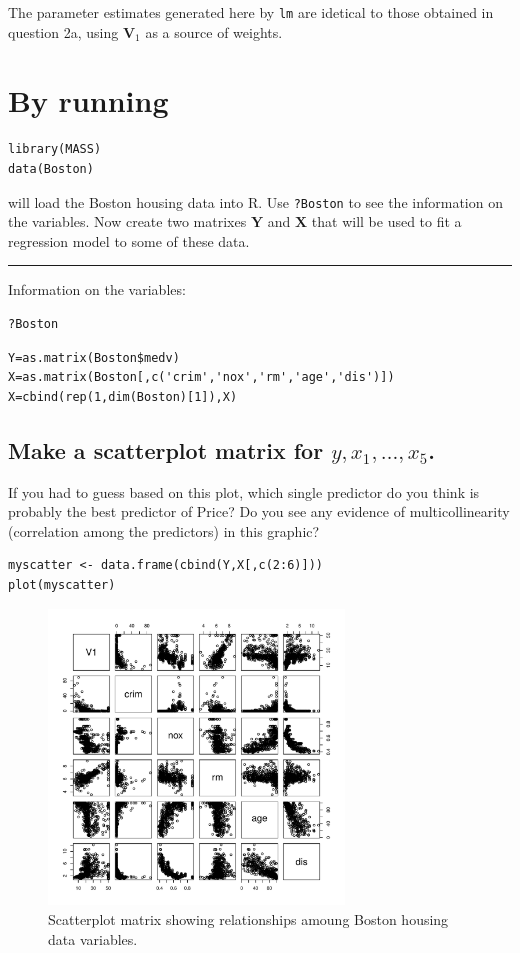 \documentclass[11pt]{article}
\begin{document}
The parameter estimates generated here by \verb~lm~ are idetical to those obtained in
question 2a, using \textbf{V$_1$} as a source of weights.
\section{By running}
\label{sec-4}



\begin{verbatim}
library(MASS)
data(Boston)
\end{verbatim}

will load the Boston housing data into R. Use \verb~?Boston~ to see the
information on the variables. Now create two matrixes $\mathbf{Y}$
and $\mathbf{X}$ that will be used to fit a regression model to some
of these data.

\rule{0.5\textwidth}{0.5pt}

Information on the variables:

\begin{verbatim}
?Boston
\end{verbatim}



\begin{verbatim}
Y=as.matrix(Boston$medv)
X=as.matrix(Boston[,c('crim','nox','rm','age','dis')])
X=cbind(rep(1,dim(Boston)[1]),X)
\end{verbatim}
\subsection{Make a scatterplot matrix for $y,x_1,\ldots,x_5$.}
\label{sec-4-1}

If you had to guess based on this plot, which single predictor 
do you think is probably the best predictor of Price? Do you 
see any evidence of multicollinearity (correlation among the
predictors) in this graphic?


\begin{verbatim}
myscatter <- data.frame(cbind(Y,X[,c(2:6)]))
plot(myscatter)
\end{verbatim}

\begin{figure}[H]
\centering
\includegraphics[width=0.7\textwidth]{HW2_4a.pdf}
\caption{Scatterplot matrix showing relationships amoung Boston housing data variables.}
\end{figure}
\end{document}
